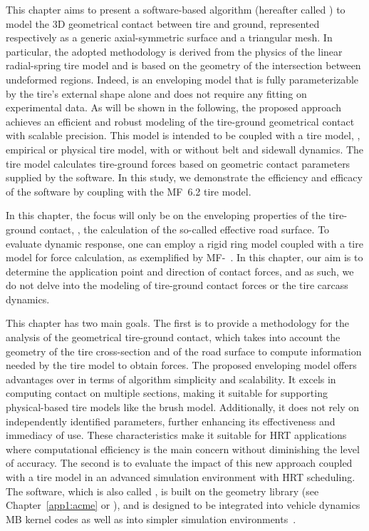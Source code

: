 This chapter aims to present a software-based algorithm (hereafter called \Enve{}) to model the 3D geometrical contact between tire and ground, represented respectively as a generic axial-symmetric surface and a triangular mesh. In particular, the adopted methodology is derived from the physics of the linear radial-spring tire model and is based on the geometry of the intersection between undeformed regions. Indeed, \Enve{} is an enveloping model that is fully parameterizable by the tire's external shape alone and does not require any fitting on experimental data. As will be shown in the following, the proposed approach achieves an efficient and robust modeling of the tire-ground geometrical contact with scalable precision. This model is intended to be coupled with a tire model, \ie{}, empirical or physical tire model, with or without belt and sidewall dynamics. The tire model calculates tire-ground forces based on geometric contact parameters supplied by the \Enve{} software. In this study, we demonstrate the efficiency and efficacy of the software by coupling \Enve{} with the \ac{MF}~6.2 tire model.
%
\begin{remark}
  In this chapter, the focus will only be on the enveloping properties of the tire-ground contact, \ie{}, the calculation of the so-called effective road surface. To evaluate dynamic response, one can employ a rigid ring model coupled with a tire model for force calculation, as exemplified by \ac{MF}-\Swift{}~\cite{pacejka2012tire, schmeitz2004semiempirical}. In this chapter, our aim is to determine the application point and direction of contact forces, and as such, we do not delve into the modeling of tire-ground contact forces or the tire carcass dynamics.
\end{remark}
%
This chapter has two main goals. The first is to provide a methodology for the analysis of the geometrical tire-ground contact, which takes into account the geometry of the tire cross-section and of the road surface to compute information needed by the tire model to obtain forces. The proposed enveloping model offers advantages over \Swift{} in terms of algorithm simplicity and scalability. It excels in computing contact on multiple sections, making it suitable for supporting physical-based tire models like the brush model. Additionally, it does not rely on independently identified parameters, further enhancing its effectiveness and immediacy of use. These characteristics make it suitable for \ac{HRT} applications where computational efficiency is the main concern without diminishing the level of accuracy. The second is to evaluate the impact of this new approach coupled with a tire model in an advanced simulation environment with \ac{HRT} scheduling. The software, which is also called \Enve{}, is built on the \Acme{} geometry library (see Chapter~\ref{app1:acme} or \citet{stocco2021acme}), and is designed to be integrated into vehicle dynamics \ac{MB} kernel codes as well as into simpler simulation environments~\cite{piccinini2022predictive, piccinini2023physics}.

